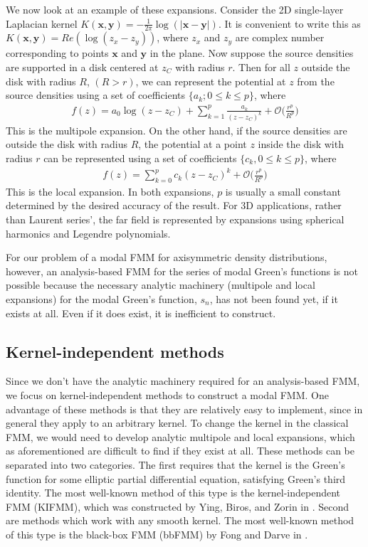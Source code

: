 \documentclass[11pt, oneside]{article}   	%
\begin{document}
We now look at an example of these expansions. Consider the 2D single-layer Laplacian kernel $K(\mathbf{x},\mathbf{y})=-\frac{1}{2\pi}\log(|\mathbf{x}-\mathbf{y}|)$. It is convenient to write this as $K(\mathbf{x},\mathbf{y})=Re(\log(z_x-z_y))$, where $z_x$ and $z_y$ are complex number corresponding to points $\mathbf{x}$ and $\mathbf{y}$ in the plane. Now suppose the source densities are supported in a disk centered at $z_C$ with radius $r$. Then for all $z$ outside the disk with radius $R$, $(R > r)$, we can represent the potential at $z$ from the source densities using a set of coefficients $\{a_k ; 0 \le k \le p\}$, where
\begin{align}
f(z)=a_0\log(z-z_C)+\sum_{k=1}^p\frac{a_k}{(z-z_C)^k}+\mathcal{O}\bigg(\frac{r^p}{R^p}\bigg)
\end{align}
This is the multipole expansion. On the other hand, if the source densities are outside the disk with radius $R$, the potential at a point $z$ inside the disk with radius $r$ can be represented using a set of coefficients $\{c_k, 0\le k\le p\}$, where
\begin{align}
f(z)=\sum_{k=0}^pc_k(z-z_C)^k+\mathcal{O}\bigg(\frac{r^p}{R^p}\bigg)
\end{align}
This is the local expansion. In both expansions, $p$ is usually a small constant determined by the desired accuracy of the result. For 3D applications, rather than Laurent series', the far field is represented by expansions using spherical harmonics and Legendre polynomials.

For our problem of a modal FMM for axisymmetric density distributions, however, an analysis-based FMM for the series of modal Green's functions is not possible because the necessary analytic machinery (multipole and local expansions) for the modal Green's function, $s_n$, has not been found yet, if it exists at all. Even if it does exist, it is inefficient to construct.

\subsection{Kernel-independent methods}
Since we don't have the analytic machinery required for an analysis-based FMM, we focus on kernel-independent methods to construct a modal FMM. One advantage of these methods is that they are relatively easy to implement, since in general they apply to an arbitrary kernel. To change the kernel in the classical FMM, we would need to develop analytic multipole and local expansions, which as aforementioned are difficult to find if they exist at all. These methods can be separated into two categories. The first requires that the kernel is the Green's function for some elliptic partial differential equation, satisfying Green's third identity. The most well-known method of this type is the kernel-independent FMM (KIFMM), which was constructed by Ying, Biros, and Zorin in \cite{YBZ}. Second are methods which work with any smooth kernel. The most well-known method of this type is the black-box FMM (bbFMM) by Fong and Darve in \cite{FD}.
\end{document}
